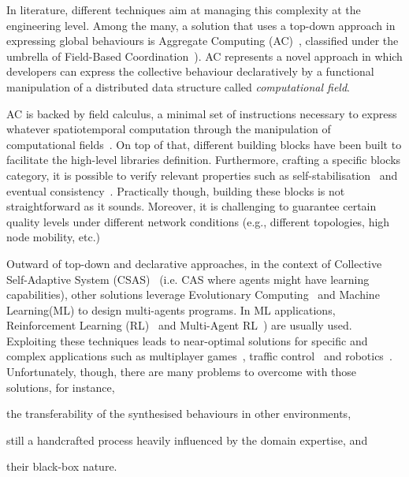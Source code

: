 \documentclass[conference]{IEEEtran}
\begin{document}
In literature, different techniques aim at managing this complexity at the engineering level.
%
Among the many, a solution that uses a top-down approach in expressing global behaviours is Aggregate Computing (AC)~\cite{DBLP:journals/computer/BealPV15}, classified under the umbrella of Field-Based Coordination~\cite{DBLP:books/daglib/0015276}).
%
AC represents a novel approach in which developers can express the collective behaviour declaratively by a functional manipulation of a distributed data structure called \emph{computational field}.

AC is backed by field calculus, a minimal set of instructions necessary to express whatever spatiotemporal computation through the manipulation of computational fields~\cite{DBLP:conf/coordination/AudritoBDV18}. 
%
On top of that, different building blocks have been built to facilitate the high-level libraries definition.
%
Furthermore, crafting a specific blocks category, it is possible to verify relevant properties such as self-stabilisation~\cite{DBLP:conf/coordination/ViroliD14} and eventual consistency~\cite{DBLP:conf/saso/BealVPD16}.
%
Practically though, building these blocks is not straightforward as it sounds. 
%
Moreover, it is challenging to guarantee certain quality levels under different network conditions (e.g., different topologies, high node mobility, etc.)

Outward of top-down and declarative approaches, in the context of Collective Self-Adaptive System (CSAS)~\cite{DBLP:conf/metacognition/Mitchell05} (i.e. CAS where agents might have learning capabilities), other solutions leverage Evolutionary Computing~\cite{DBLP:journals/swarm/BrambillaFBD13} and Machine Learning(ML) to design multi-agents programs. 
%
In ML applications, Reinforcement Learning (RL)~\cite{DBLP:journals/access/NaeemRC20} and Multi-Agent RL~\cite{DBLP:journals/tcyb/NguyenNN20}) are usually used.
%
Exploiting these techniques leads to near-optimal solutions for specific and complex applications such as multiplayer games~\cite{DBLP:journals/nature/VinyalsBCMDCCPE19, DBLP:journals/taas/HaoLM15}, traffic control~\cite{DBLP:journals/aes/JinMK17, DBLP:conf/icac/SteinTRH16} and robotics~\cite{DBLP:journals/taas/KraemerB14}.
%
Unfortunately, though, there are many problems to overcome with those solutions, for instance,
\begin{enumerate*}[label=(\roman*)]
    \item the transferability of the synthesised behaviours in other environments, 
    \item still a handcrafted process heavily influenced by the domain expertise, and
    \item their black-box nature.
\end{enumerate*}
\end{document}
